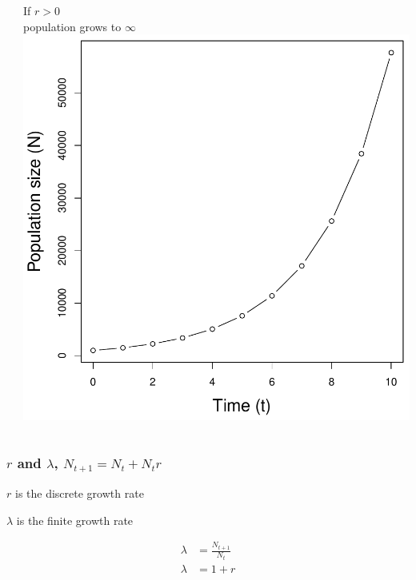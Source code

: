 \documentclass[color=usenames,dvipsnames]{beamer}\usepackage[]{graphicx}\usepackage[]{color}
\begin{document}
\begin{frame}
\begin{columns}
\begin{column}{0.33\textwidth}
    \end{column}
    \begin{column}{0.33\textwidth}
      \small
      \centering
      If $r > 0$ \\ population grows to $\infty$ \\
      \includegraphics[width=\textwidth]{figs/rg0}
    \end{column}
  \end{columns}
\end{frame}







\begin{frame}
  \frametitle{$r$ and $\lambda$, $N_{t+1} = N_t + N_tr$}
  \Large
  $r$ is the discrete growth rate \par
  \vspace{0.5cm}
  $\lambda$ is the finite growth rate \par
  \begin{align*}
    \lambda &= \frac{N_{t+1}}{N_t} \\
    \lambda &= 1+r
  \end{align*}
\end{frame}
\end{document}
